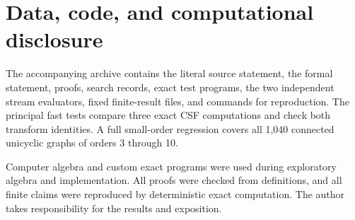 \documentclass[11pt]{amsart}
\theoremstyle{definition}
\begin{document}
\section*{Data, code, and computational disclosure}

The accompanying archive contains the literal source statement, the formal
statement, proofs, search records, exact test programs, the two independent
stream evaluators, fixed finite-result files, and commands for reproduction.
The principal fast tests compare three exact CSF computations and check both
transform identities.  A full small-order regression covers all 1,040
connected unicyclic graphs of orders 3 through 10.

Computer algebra and custom exact programs were used during exploratory
algebra and implementation.  All proofs were checked from definitions, and
all finite claims were reproduced by deterministic exact computation.  The
author takes responsibility for the results and exposition.



\end{document}
